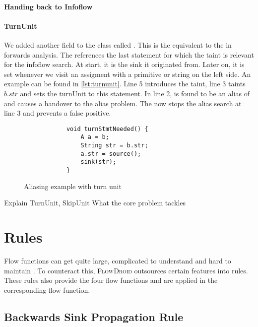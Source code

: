\documentclass[../draft.tex]{subfiles}
\begin{document}
    \paragraph{Handing back to Infoflow}

    \paragraph{TurnUnit} 
    We added another field to the  class called . This is the equivalent to the  in forwards analysis. The  references the last statement for which the taint is relevant for the infoflow search. At start, it is the sink it originated from. Later on, it is set whenever we visit an assigment with a primitive or string on the left side. An example can be found in \autoref{lst:turnunit}. Line 5 introduces the taint, line 3 taints $b.str$ and sets the turnUnit to this statement. In line 2,  is found to be an alias of  and causes a handover to the alias problem. The  now stops the alias search at line 3 and prevents a false positive.

    \begin{figure}[ht]
        \centering
        \begin{lstlisting}
            void turnStmtNeeded() {
                A a = b;
                String str = b.str;
                a.str = source();
                sink(str);
            }
        \end{lstlisting}
        \caption{Aliasing example with turn unit}
        \label{lst:turnunit}
    \end{figure}


    Explain TurnUnit, SkipUnit
    What the core problem tackles

    \section{Rules}
    Flow functions can get quite large, complicated to understand and hard to maintain \cite{Lerch2015}. To counteract this, \textsc{FlowDroid} outsources certain features into rules. These rules also provide the four flow functions and are applied in the corresponding flow function.

    \subsection{Backwards Sink Propagation Rule}
\end{document}
